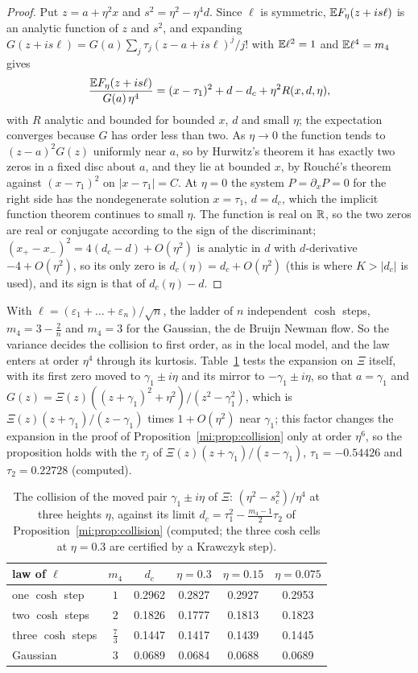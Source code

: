 \begin{proof}
Put $z=a+\eta^2x$ and $s^2=\eta^2-\eta^4d$. Since $\ell$ is symmetric, $\mathbb{E} F_\eta(z+is\ell)$ is an analytic function of $z$ and $s^2$, and expanding $G(z+is\ell)=G(a)\sum_j\tau_j(z-a+is\ell)^j/j!$ with $\mathbb{E}\ell^2=1$ and $\mathbb{E}\ell^4=m_4$ gives
\[
\frac{\mathbb{E} F_\eta(z+is\ell)}{G(a)\,\eta^4}=(x-\tau_1)^2+d-d_c+\eta^2R(x,d,\eta),
\]
with $R$ analytic and bounded for bounded $x$, $d$ and small $\eta$; the expectation converges because $G$ has order less than two. As $\eta\to0$ the function tends to $(z-a)^2G(z)$ uniformly near $a$, so by Hurwitz's theorem it has exactly two zeros in a fixed disc about $a$, and they lie at bounded $x$, by Rouch\'e's theorem against $(x-\tau_1)^2$ on $|x-\tau_1|=C$. At $\eta=0$ the system $P=\partial_xP=0$ for the right side has the nondegenerate solution $x=\tau_1$, $d=d_c$, which the implicit function theorem continues to small $\eta$. The function is real on $\mathbb{R}$, so the two zeros are real or conjugate according to the sign of the discriminant; $(x_+-x_-)^2=4(d_c-d)+O(\eta^2)$ is analytic in $d$ with $d$-derivative $-4+O(\eta^2)$, so its only zero is $d_c(\eta)=d_c+O(\eta^2)$ (this is where $K>|d_c|$ is used), and its sign is that of $d_c(\eta)-d$.
\end{proof}

With $\ell=(\varepsilon_1+\dots+\varepsilon_n)/\sqrt n$, the ladder of $n$ independent $\cosh$ steps, $m_4=3-\frac2n$ and $m_4=3$ for the Gaussian, the de Bruijn Newman flow. So the variance decides the collision to first order, as in the local model, and the law enters at order $\eta^4$ through its kurtosis. Table~\ref{mi:tab:collide} tests the expansion on $\Xi$ itself, with its first zero moved to $\gamma_1\pm i\eta$ and its mirror to $-\gamma_1\pm i\eta$, so that $a=\gamma_1$ and $G(z)=\Xi(z)((z+\gamma_1)^2+\eta^2)/(z^2-\gamma_1^2)$, which is $\Xi(z)(z+\gamma_1)/(z-\gamma_1)$ times $1+O(\eta^2)$ near $\gamma_1$; this factor changes the expansion in the proof of Proposition~\ref{mi:prop:collision} only at order $\eta^6$, so the proposition holds with the $\tau_j$ of $\Xi(z)(z+\gamma_1)/(z-\gamma_1)$, $\tau_1=-0.54426$ and $\tau_2=0.22728$ (computed).

\begin{table}[ht]
\centering
\begin{tabular}{lccccc}
\toprule
law of $\ell$ & $m_4$ & $d_c$ & $\eta=0.3$ & $\eta=0.15$ & $\eta=0.075$\\
\midrule
one $\cosh$ step & $1$ & 0.2962 & 0.2827 & 0.2927 & 0.2953\\
two $\cosh$ steps & $2$ & 0.1826 & 0.1777 & 0.1813 & 0.1823\\
three $\cosh$ steps & $\frac73$ & 0.1447 & 0.1417 & 0.1439 & 0.1445\\
Gaussian & $3$ & 0.0689 & 0.0684 & 0.0688 & 0.0689\\
\bottomrule
\end{tabular}
\caption{The collision of the moved pair $\gamma_1\pm i\eta$ of $\Xi$: $(\eta^2-s_c^2)/\eta^4$ at three heights $\eta$, against its limit $d_c=\tau_1^2-\frac{m_4-1}2\tau_2$ of Proposition~\ref{mi:prop:collision} (computed; the three cosh cells at $\eta=0.3$ are certified by a Krawczyk step).}
\label{mi:tab:collide}
\end{table}


